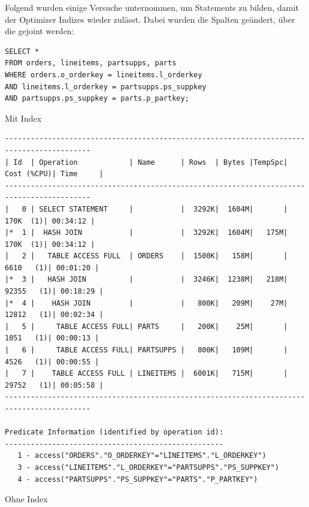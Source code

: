 \documentclass[10pt]{article}
\begin{document}
\newpage
Folgend wurden einige Versuche unternommen, um Statements zu bilden, damit der Optimizer Indizes wieder zulässt. Dabei wurden die Spalten geändert, über die gejoint werden:
\begin{lstlisting}[style=sql]
SELECT *
FROM orders, lineitems, partsupps, parts
WHERE orders.o_orderkey = lineitems.l_orderkey
AND lineitems.l_orderkey = partsupps.ps_suppkey
AND partsupps.ps_suppkey = parts.p_partkey;
\end{lstlisting}
Mit Index
\begin{lstlisting}[style=queryexecutionplan]
------------------------------------------------------------------------------------------
| Id  | Operation            | Name      | Rows  | Bytes |TempSpc| Cost (%CPU)| Time     |
------------------------------------------------------------------------------------------
|   0 | SELECT STATEMENT     |           |  3292K|  1604M|       |   170K  (1)| 00:34:12 |
|*  1 |  HASH JOIN           |           |  3292K|  1604M|   175M|   170K  (1)| 00:34:12 |
|   2 |   TABLE ACCESS FULL  | ORDERS    |  1500K|   158M|       |  6610   (1)| 00:01:20 |
|*  3 |   HASH JOIN          |           |  3246K|  1238M|   218M| 92355   (1)| 00:18:29 |
|*  4 |    HASH JOIN         |           |   800K|   209M|    27M| 12812   (1)| 00:02:34 |
|   5 |     TABLE ACCESS FULL| PARTS     |   200K|    25M|       |  1051   (1)| 00:00:13 |
|   6 |     TABLE ACCESS FULL| PARTSUPPS |   800K|   109M|       |  4526   (1)| 00:00:55 |
|   7 |    TABLE ACCESS FULL | LINEITEMS |  6001K|   715M|       | 29752   (1)| 00:05:58 |
------------------------------------------------------------------------------------------
 
Predicate Information (identified by operation id):
---------------------------------------------------
   1 - access("ORDERS"."O_ORDERKEY"="LINEITEMS"."L_ORDERKEY")
   3 - access("LINEITEMS"."L_ORDERKEY"="PARTSUPPS"."PS_SUPPKEY")
   4 - access("PARTSUPPS"."PS_SUPPKEY"="PARTS"."P_PARTKEY")
\end{lstlisting}
Ohne Index
\end{document}
